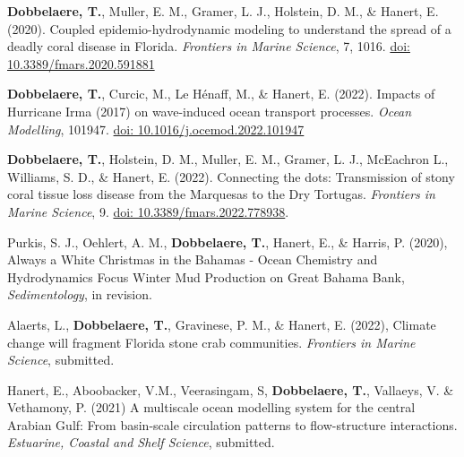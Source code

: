 \begin{list}{}{%
    \setlength{\topsep}{0pt}%
    \setlength{\leftmargin}{0.23in}%
    \setlength{\listparindent}{-0.23in}%
    \setlength{\itemindent}{-0.23in}%
    \setlength{\parsep}{\parskip}%
    }%
        
    \item \textbf{Dobbelaere, T.}, Muller, E. M., Gramer, L. J., Holstein, D. M., \& Hanert, E.
    (2020). Coupled epidemio-hydrodynamic modeling to understand the spread
    of a deadly coral disease in Florida. \textit{Frontiers in Marine Science}, 7, 1016. \href{https://www.frontiersin.org/articles/10.3389/fmars.2020.591881/full}{doi: 10.3389/fmars.2020.591881}
    
    \item \textbf{Dobbelaere, T.}, Curcic, M., Le Hénaff, M., \& Hanert, E. (2022). Impacts of Hurricane Irma (2017) on wave-induced ocean transport processes. \textit{Ocean Modelling}, 101947. \href{https://www.sciencedirect.com/science/article/pii/S1463500322000026}{doi: 10.1016/j.ocemod.2022.101947}
    
    \item \textbf{Dobbelaere, T.}, Holstein, D. M., Muller, E. M., Gramer, L. J., McEachron L., Williams, S. D., \& Hanert, E. (2022). Connecting the dots: Transmission of stony coral tissue loss disease from the Marquesas to the Dry Tortugas. \textit{Frontiers in Marine Science}, 9. \href{https://www.frontiersin.org/article/10.3389/fmars.2022.778938}{doi: 10.3389/fmars.2022.778938}.
    
    \item Purkis, S. J., Oehlert, A. M., \textbf{Dobbelaere, T.}, Hanert, E., \& Harris, P. (2020), Always a White Christmas in the Bahamas - Ocean Chemistry and Hydrodynamics Focus Winter Mud Production on Great Bahama Bank, \textit{Sedimentology}, in revision.
    
    \item Alaerts, L., \textbf{Dobbelaere, T.}, Gravinese, P. M., \& Hanert, E. (2022), Climate change will fragment Florida stone crab communities. \textit{Frontiers in Marine Science}, submitted.
    
    \item Hanert, E., Aboobacker, V.M., Veerasingam, S, \textbf{Dobbelaere, T.}, Vallaeys, V. \&
    Vethamony, P. (2021) A multiscale ocean modelling system for the central Arabian Gulf: From basin-scale circulation patterns to flow-structure interactions. \textit{Estuarine, Coastal and Shelf Science}, submitted.
    

\end{list}

